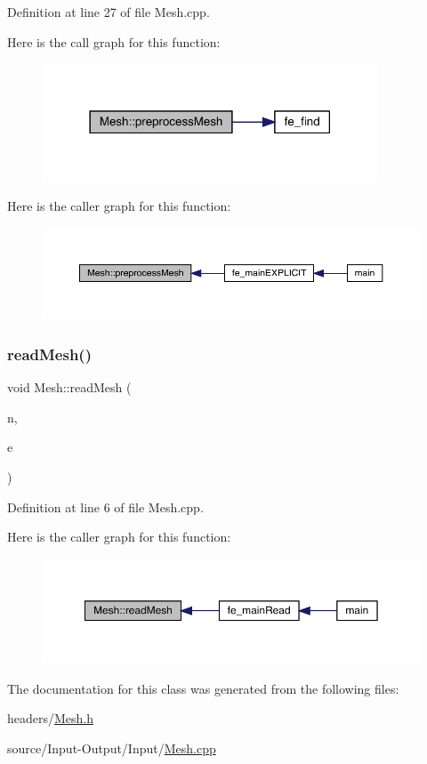 Definition at line 27 of file Mesh.\+cpp.

Here is the call graph for this function\+:
\nopagebreak
\begin{figure}[H]
\begin{center}
\leavevmode
\includegraphics[width=282pt]{class_mesh_aa8a6f260e9589be4c0a2fcc146e696d5_cgraph}
\end{center}
\end{figure}
Here is the caller graph for this function\+:
\nopagebreak
\begin{figure}[H]
\begin{center}
\leavevmode
\includegraphics[width=350pt]{class_mesh_aa8a6f260e9589be4c0a2fcc146e696d5_icgraph}
\end{center}
\end{figure}
\mbox{\label{class_mesh_a2e0931c78a7ef01ccc9bf8f0dd74afb0}} 
\subsubsection{\texorpdfstring{read\+Mesh()}{readMesh()}}
{\footnotesize\ttfamily void Mesh\+::read\+Mesh (\begin{DoxyParamCaption}\item[{Matrix\+Xd}]{n,  }\item[{Matrix\+Xd}]{e }\end{DoxyParamCaption})}



Definition at line 6 of file Mesh.\+cpp.

Here is the caller graph for this function\+:
\nopagebreak
\begin{figure}[H]
\begin{center}
\leavevmode
\includegraphics[width=350pt]{class_mesh_a2e0931c78a7ef01ccc9bf8f0dd74afb0_icgraph}
\end{center}
\end{figure}


The documentation for this class was generated from the following files\+:\begin{DoxyCompactItemize}
\item 
headers/\hyperlink{_mesh_8h}{Mesh.\+h}\item 
source/\+Input-\/\+Output/\+Input/\hyperlink{_mesh_8cpp}{Mesh.\+cpp}\end{DoxyCompactItemize}
